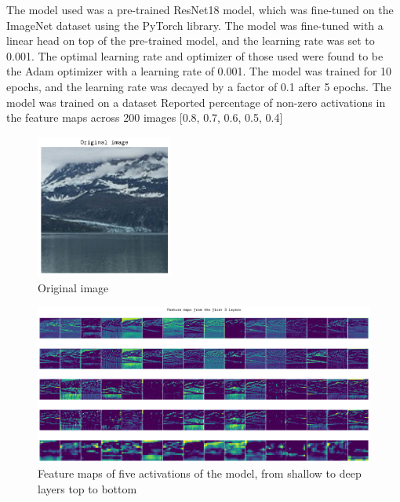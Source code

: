 \documentclass{article}[9pt]
\begin{document}
\begin{multicols}{2}
The model used was a pre-trained ResNet18 model, which was fine-tuned on the ImageNet dataset
using the PyTorch library. The model was fine-tuned with a linear head on top of the pre-trained
model, and the learning rate was set to 0.001. The optimal learning rate and optimizer of those
used were found to be the Adam optimizer with a learning rate of 0.001. The model was trained for
10 epochs, and the learning rate was decayed by a factor of 0.1 after 5 epochs. The model was
trained on a dataset
Reported percentage of non-zero activations in the feature maps across 200 images
[0.8, 0.7, 0.6, 0.5, 0.4]
\end{multicols}

\clearpage

\begin{figure}[!t]
    \centering
    \includegraphics[width=0.4\textwidth]{original-image.png}
    \caption{Original image}
    \label{fig:original-image}
\end{figure}
\begin{figure}[h]
    \centering
    \includegraphics[width=1.0\textwidth]{featuremaps.png}
    \caption{Feature maps of five activations of the model, from 
        shallow to deep layers top to bottom}
    \label{fig:featuremaps}
\end{figure}
\end{document}
